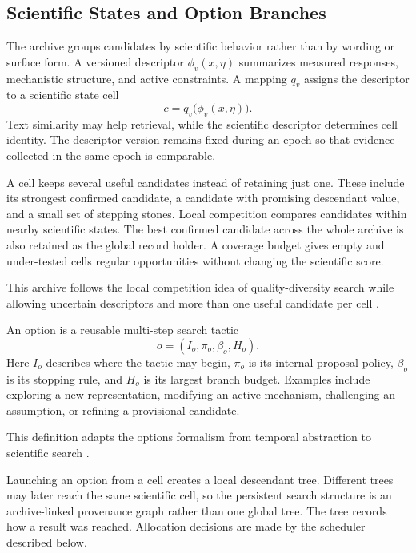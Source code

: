 \subsection{Scientific States and Option Branches}
\label{secstatesoptions}

The archive groups candidates by scientific behavior rather than by wording or surface form. A versioned descriptor $\phi_v(x,\eta)$ summarizes measured responses, mechanistic structure, and active constraints. A mapping $q_v$ assigns the descriptor to a scientific state cell
\begin{equation}
c=q_v\bigl(\phi_v(x,\eta)\bigr).
\label{eqcell}
\end{equation}
Text similarity may help retrieval, while the scientific descriptor determines cell identity. The descriptor version remains fixed during an epoch so that evidence collected in the same epoch is comparable.

A cell keeps several useful candidates instead of retaining just one. These include its strongest confirmed candidate, a candidate with promising descendant value, and a small set of stepping stones. Local competition compares candidates within nearby scientific states. The best confirmed candidate across the whole archive is also retained as the global record holder. A coverage budget gives empty and under-tested cells regular opportunities without changing the scientific score.

This archive follows the local competition idea of quality-diversity search while allowing uncertain descriptors and more than one useful candidate per cell \citep{mouret2015,flageat2023}.

An option is a reusable multi-step search tactic
\begin{equation}
o=(I_o,\pi_o,\beta_o,H_o).
\label{eqoption}
\end{equation}
Here $I_o$ describes where the tactic may begin, $\pi_o$ is its internal proposal policy, $\beta_o$ is its stopping rule, and $H_o$ is its largest branch budget. Examples include exploring a new representation, modifying an active mechanism, challenging an assumption, or refining a provisional candidate.

This definition adapts the options formalism from temporal abstraction to scientific search \citep{sutton1999,bacon2017}.

Launching an option from a cell creates a local descendant tree. Different trees may later reach the same scientific cell, so the persistent search structure is an archive-linked provenance graph rather than one global tree. The tree records how a result was reached. Allocation decisions are made by the scheduler described below.

